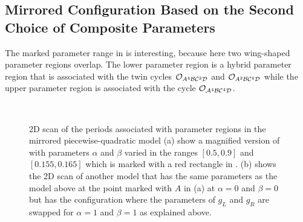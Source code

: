 \clearpage
\subsection{Mirrored Configuration Based on the Second Choice of Composite Parameters}

The marked parameter range in  is interesting, because here two wing-shaped parameter regions overlap.
The lower parameter region is a hybrid parameter region that is associated with the twin cycles $\mathcal{O}_{A^4\mathcal{B}\mathcal{C}^2\mathcal{D}}$ and $\mathcal{O}_{A^2\mathcal{B}\mathcal{C}^4\mathcal{D}}$ while the upper parameter region is associated with the cycle $\mathcal{O}_{\mathcal{A}^4\mathcal{B}\mathcal{C}^4\mathcal{D}}$.

\begin{figure}
	\centering
	 \\
	\caption[2D scan of the periods associated with parameter regions in the mirrored piecewise-quadratic model]{
		2D scan of the periods associated with parameter regions in the mirrored piecewise-quadratic model
		(a) show a magnified version of  with parameters $\alpha$ and $\beta$ varied in the ranges $[0.5, 0.9]$ and $[0.155, 0.165]$ which is marked with a red rectangle in .
		(b) shows the 2D scan of another model that has the same parameters as the model above at the point marked with $A$ in (a) at $\alpha = 0$ and $\beta = 0$ but has the configuration where the parameters of $g_L$ and $g_R$ are swapped for $\alpha = 1$ and $\beta = 1$ as explained above.
	}
\end{figure}

